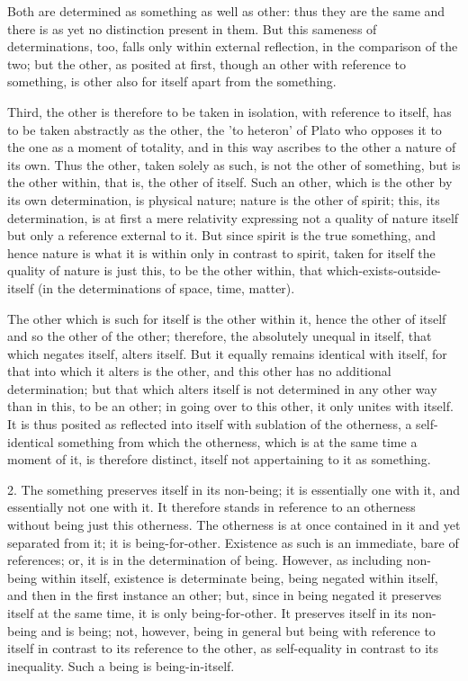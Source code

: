 Both are determined as something as well as other:
thus they are the same and there is as yet
no distinction present in them.
But this sameness of determinations, too,
falls only within external reflection,
in the comparison of the two;
but the other, as posited at first,
though an other with reference to something,
is other also for itself apart from the something.

Third, the other is therefore to be taken in isolation,
with reference to itself, has to be taken abstractly as the other,
the 'to heteron' of Plato who opposes it to the one
as a moment of totality,
and in this way ascribes to the other a nature of its own.
Thus the other, taken solely as such,
is not the other of something,
but is the other within, that is, the other of itself.
Such an other, which is the other by its own determination,
is physical nature; nature is the other of spirit;
this, its determination, is at first
a mere relativity expressing not a quality of nature itself
but only a reference external to it.
But since spirit is the true something,
and hence nature is what it is within only in contrast to spirit,
taken for itself the quality of nature is just this,
to be the other within, that which-exists-outside-itself
(in the determinations of space, time, matter).

The other which is such for itself is the other within it,
hence the other of itself and so the other of the other;
therefore, the absolutely unequal in itself,
that which negates itself, alters itself.
But it equally remains identical with itself,
for that into which it alters is the other,
and this other has no additional determination;
but that which alters itself is not determined in
any other way than in this, to be an other;
in going over to this other, it only unites with itself.
It is thus posited as reflected into itself
with sublation of the otherness,
a self-identical something from which the otherness,
which is at the same time a moment of it, is therefore distinct,
itself not appertaining to it as something.

2. The something preserves itself in its non-being;
it is essentially one with it, and essentially not one with it.
It therefore stands in reference to an otherness
without being just this otherness.
The otherness is at once contained in it
and yet separated from it;
it is being-for-other.
Existence as such is an immediate, bare of references;
or, it is in the determination of being.
However, as including non-being within itself,
existence is determinate being,
being negated within itself,
and then in the first instance an other;
but, since in being negated it preserves itself
at the same time, it is only being-for-other.
It preserves itself in its non-being and is being;
not, however, being in general but being with reference
to itself in contrast to its reference to the other,
as self-equality in contrast to its inequality.
Such a being is being-in-itself.

